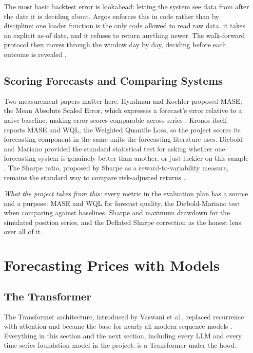 \documentclass[conference]{IEEEtran}
\newcommand{\sys}{Argos}
\begin{document}
The most basic backtest error is lookahead: letting the system see data from after the date it is deciding about. \sys{} enforces this in code rather than by discipline: one loader function is the only code allowed to read raw data, it takes an explicit as-of date, and it refuses to return anything newer. The walk-forward protocol then moves through the window day by day, deciding before each outcome is revealed \cite{lopezdeprado2018advances}.

\subsection{Scoring Forecasts and Comparing Systems}

Two measurement papers matter here. Hyndman and Koehler proposed MASE, the Mean Absolute Scaled Error, which expresses a forecast's error relative to a naive baseline, making error scores comparable across series \cite{hyndman2006another}. Kronos itself reports MASE and WQL, the Weighted Quantile Loss, so the project scores its forecasting component in the same units the forecasting literature uses. Diebold and Mariano provided the standard statistical test for asking whether one forecasting system is genuinely better than another, or just luckier on this sample \cite{diebold1995comparing}. The Sharpe ratio, proposed by Sharpe as a reward-to-variability measure, remains the standard way to compare risk-adjusted returns \cite{sharpe1994sharpe}.

\emph{What the project takes from this:} every metric in the evaluation plan has a source and a purpose: MASE and WQL for forecast quality, the Diebold-Mariano test when comparing against baselines, Sharpe and maximum drawdown for the simulated position series, and the Deflated Sharpe correction as the honest lens over all of it.

\section{Forecasting Prices with Models}
\label{sec:forecasting}

\subsection{The Transformer}

The Transformer architecture, introduced by Vaswani et al., replaced recurrence with attention and became the base for nearly all modern sequence models \cite{vaswani2017attention}. Everything in this section and the next section, including every LLM and every time-series foundation model in the project, is a Transformer under the hood.
\end{document}
